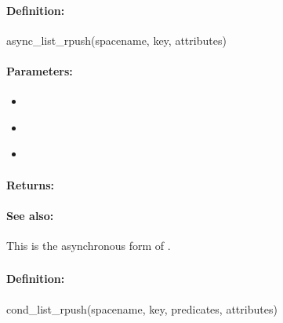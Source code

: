 \paragraph{Definition:}
\begin{rubycode}
async_list_rpush(spacename, key, attributes)
\end{rubycode}

\paragraph{Parameters:}
\begin{itemize}[noitemsep]
\item {}\\

\item {}\\

\item {}\\

\end{itemize}

\paragraph{Returns:}


\paragraph{See also:}  This is the asynchronous form of .

\pagebreak
\subsubsection{}
\label{api:ruby:cond_list_rpush}


\paragraph{Definition:}
\begin{rubycode}
cond_list_rpush(spacename, key, predicates, attributes)
\end{rubycode}

